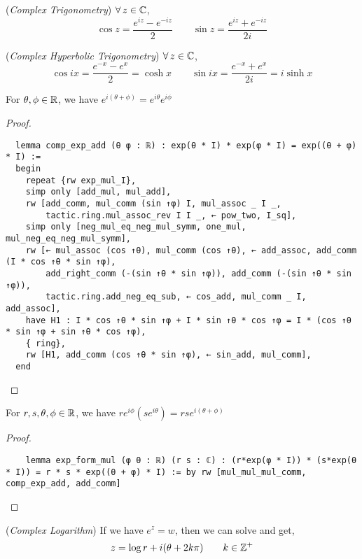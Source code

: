 \documentclass{article}
\begin{document}
\begin{ndefi}{(\textit{Complex Trigonometry})}
  $\forall\, z \in\mathbb{C}$,
  $$ \cos z = \frac{e^{iz} - e^{-iz}}{2} \qquad \sin z = \frac{e^{iz} + e^{-iz}}{2i} $$
\end{ndefi}

\begin{ndefi}{(\textit{Complex Hyperbolic Trigonometry})}
  $\forall\, z \in\mathbb{C}$,
  $$ \cos ix = \frac{e^{-x} - e^{x}}{2} = \cosh x \qquad \sin ix = \frac{e^{-x} + e^{x}}{2i} = i\sinh x $$
\end{ndefi}

\begin{nlemma}
  For $\theta, \phi \in \mathbb{R}$, we have $e^{i(\theta + \phi)} = e^{i\theta}e^{i\phi}$
\end{nlemma}
\begin{proof}
  \begin{lstlisting}
  lemma comp_exp_add (θ φ : ℝ) : exp(θ * I) * exp(φ * I) = exp((θ + φ) * I) :=
  begin
    repeat {rw exp_mul_I},
    simp only [add_mul, mul_add],
    rw [add_comm, mul_comm (sin ↑φ) I, mul_assoc _ I _,
        tactic.ring.mul_assoc_rev I I _, ← pow_two, I_sq],
    simp only [neg_mul_eq_neg_mul_symm, one_mul, mul_neg_eq_neg_mul_symm],
    rw [← mul_assoc (cos ↑θ), mul_comm (cos ↑θ), ← add_assoc, add_comm (I * cos ↑θ * sin ↑φ),
        add_right_comm (-(sin ↑θ * sin ↑φ)), add_comm (-(sin ↑θ * sin ↑φ)),
        tactic.ring.add_neg_eq_sub, ← cos_add, mul_comm _ I, add_assoc],
    have H1 : I * cos ↑θ * sin ↑φ + I * sin ↑θ * cos ↑φ = I * (cos ↑θ * sin ↑φ + sin ↑θ * cos ↑φ),
    { ring},
    rw [H1, add_comm (cos ↑θ * sin ↑φ), ← sin_add, mul_comm],
  end
  \end{lstlisting}
\end{proof}
\begin{ncor}
  For $r, s, \theta, \phi \in \mathbb{R}$, we have $re^{i\phi}(se^{i\theta}) = rse^{i(\theta + \phi)} $
\end{ncor}
\begin{proof}
  \begin{lstlisting}
    lemma exp_form_mul (φ θ : ℝ) (r s : ℂ) : (r*exp(φ * I)) * (s*exp(θ * I)) = r * s * exp((θ + φ) * I) := by rw [mul_mul_mul_comm, comp_exp_add, add_comm]
  \end{lstlisting}
\end{proof}

\begin{ndefi}{(\textit{Complex Logarithm})}
  If we have $e^z = w$, then we can solve and get,
  $$ z = \log r + i(\theta + 2k\pi) \qquad k \in\mathbb{Z}^+ $$
\end{ndefi}
\end{document}

